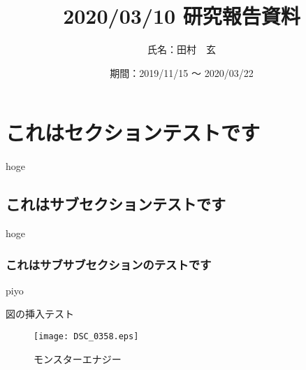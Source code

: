 \documentclass[a4j]{jarticle}
\title{2020/03/10 研究報告資料}
\author{氏名：田村　玄}
\date{期間：2019/11/15 ～ 2020/03/22}
\begin{document}
\maketitle

\section{これはセクションテストです}

hoge

\subsection{これはサブセクションテストです}

hoge

\subsubsection{これはサブサブセクションのテストです}

piyo

図の挿入テスト

\begin{figure}
\centering
\texttt{[image: DSC\_0358.eps]}
\caption{モンスターエナジー}
\end{figure}
\end{document}
